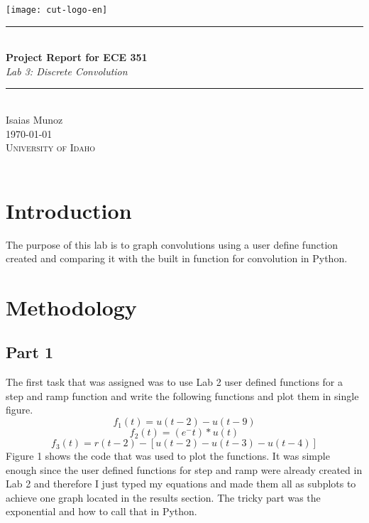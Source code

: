 \documentclass[12pt,a4paper]{article}
\newcommand{\HRule}{\rule{\linewidth}{0.5mm}}
\begin{document}
\begin{titlepage}
\begin{center}
\texttt{[image: cut-logo-en]}~\\[2cm]
\HRule \\[0.4cm]
{ \LARGE 
  \textbf{Project Report for ECE 351}\\[0.4cm]
  \emph{Lab 3: Discrete Convolution}\\[0.4cm]
}
\HRule \\[1.5cm]
{ \large
  Isaias Munoz  \\[0.1cm]
  \today\\[0.1cm]
}
\vfill
\textsc{\Large University of Idaho}\\
\\
 
\end{center}
\end{titlepage}
\newpage
\tableofcontents
{}
\newpage
\setcounter{page}{1}
\section{Introduction}\label{sec:intro}

The purpose of this lab is to graph convolutions using a user define function created and comparing it with the built in function for convolution in Python.







\section{Methodology}\label{sec:meth}
\subsection{Part 1}
The first task that was assigned was to use Lab 2 user defined functions for a step and ramp function and write the following functions and plot them in single figure.
\[f_1(t)=u(t-2)-u(t-9)\] 
\[f_2(t)=(e^-t)*u(t)\] 
\[f_3(t)=r(t-2)-[u(t-2)-u(t-3)-u(t-4)]\] 
Figure 1 shows the code that was used to plot the functions. It was simple enough since the user defined functions for step and ramp were already created in Lab 2 and therefore I just typed my equations and made them all as subplots to achieve one graph located in the results section. The tricky part was the exponential and how to call that in Python.
\end{document}
